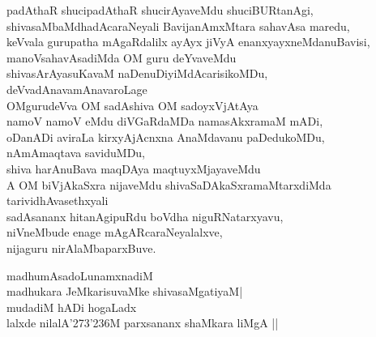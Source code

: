 \begin{entry}
\begin{shl}
padAthaR shucipadAthaR shucirAyaveMdu shuciBURtanAgi,\\
shivasaMbaMdhadAcaraNeyali BavijanAmxMtara sahavAsa maredu,\\
keVvala gurupatha mAgaRdalilx ayAyx jiVyA enanxyayxneMdanuBavisi,\\
manoVsahavAsadiMda OM guru deYvaveMdu\\
shivasArAyasuKavaM naDenuDiyiMdAcarisikoMDu,\\
deVvadAnavamAnavaroLage\\
OMgurudeVva OM sadAshiva OM sadoyxVjAtAya\\
namoV namoV eMdu diVGaRdaMDa namasAkxramaM mADi,\\
oDanADi aviraLa kirxyAjAcnxna AnaMdavanu paDedukoMDu,\\
nAmAmaqtava saviduMDu,\\
shiva harAnuBava maqDAya maqtuyxMjayaveMdu\\
A OM biVjAkaSxra nijaveMdu shivaSaDAkaSxramaMtarxdiMda tarividhAvasethxyali\\
sadAsananx hitanAgipuRdu boVdha niguRNatarxyavu,\\
niVneMbude enage mAgARcaraNeyalalxve,\\
nijaguru nirAlaMbaparxBuve.
\end{shl}
\end{entry}

\begin{entry}
\begin{shl}
madhumAsadoLunamxnadiM\\
madhukara JeMkarisuvaMke shivasaMgatiyaM|\\
mudadiM hADi hogaLadx\\
lalxde nilalA\char'273\char'236M parxsananx shaMkara liMgA ||
\end{shl}
\end{entry}

